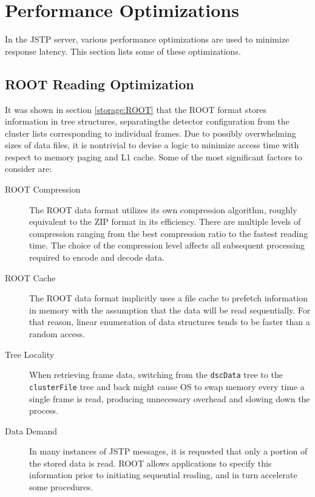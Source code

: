 \section{Performance Optimizations}
In the JSTP server, various performance optimizations are used to minimize response latency. This section lists some of these optimizations.

\subsection{ROOT Reading Optimization}
It was shown in section \ref{storage:ROOT} that the ROOT format stores information in tree structures, separatingthe detector configuration from the cluster lists corresponding to individual frames. Due to possibly overwhelming sizes of data files, it is nontrivial to devise a logic to minimize access time with respect to memory paging and L1 cache. Some of the most significant factors to consider are:

\begin{description}
	\item[ROOT Compression]
	The ROOT data format utilizes its own compression algorithm, roughly equivalent to the ZIP format in its efficiency. There are multiple levels of compression ranging from the best compression ratio to the fastest reading time. The choice of the compression level affects all subsequent processing required to encode and decode data.

	\item[ROOT Cache]
	The ROOT data format implicitly uses a file cache to prefetch information in memory with the assumption that the data will be read sequentially. For that reason, linear enumeration of data structures tends to be faster than a random access.

	\item[Tree Locality]
	When retrieving frame data, switching from the \texttt{dscData} tree to the \texttt{clusterFile} tree and back might cause OS to swap memory every time a single frame is read, producing unnecessary overhead and slowing down the process.

	\item[Data Demand]
	In many instances of JSTP messages, it is requested that only a portion of the stored data is read. ROOT allows applications to specify this information prior to initiating sequential reading, and in turn accelerate some procedures.
\end{description}

